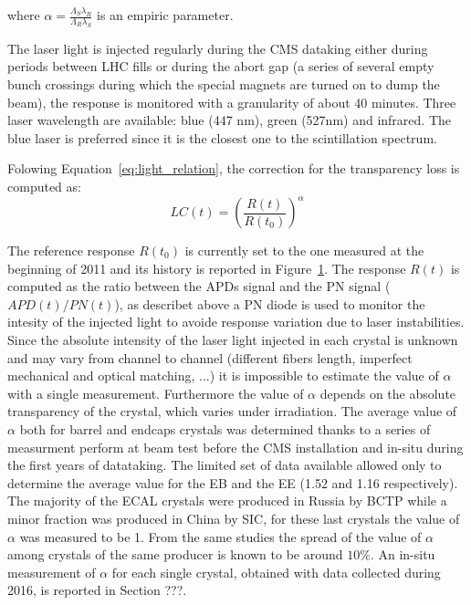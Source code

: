 where $\alpha = \frac{\Lambda_S \lambda_R}{\Lambda_R \lambda_S}$ is an empiric parameter.

The laser light is injected regularly during the CMS dataking either during periods between LHC fills or
during the abort gap (a series of several empty bunch crossings during which the special magnets 
are turned on to dump the beam), the response is monitored with a granularity of about 40 minutes.
Three laser wavelength are available: blue (447 nm), green (527nm) and infrared. The blue laser is
preferred since it is the closest one to the scintillation spectrum.

Folowing Equation~\ref{eq:light_relation}, the correction for the transparency loss is computed as:
\[
  LC(t) = \left(\frac{R(t)}{R(t_0)}\right)^{\alpha}
\]

The reference response $R(t_0)$  is currently set to the one measured at the beginning of 2011 and its history is
reported in Figure~\ref{fig:laser}.
The response $R(t)$ is computed as the ratio between the APDs signal and the PN signal ($APD(t)/PN(t)$), as describet above
a PN diode is used to monitor the intesity of the injected light to avoide response variation due to laser instabilities.
Since the absolute intensity of the laser light injected in each crystal is unknown and may vary from channel to channel
(different fibers length, imperfect mechanical and optical matching, ...) it is impossible to estimate the value of $\alpha$
with a single measurement. Furthermore the value of $\alpha$ depends on the absolute transparency of the crystal, which
varies under irradiation.
The average value of $\alpha$ both for barrel and endcaps crystals was determined thanks to a series of measurment perform
at beam test before the CMS installation and in-situ during the first years of datataking. The limited set of data available
allowed only to determine the average value for the EB and the EE (1.52 and 1.16 respectively).
The majority of the ECAL crystals were produced in
Russia by BCTP while a minor fraction was produced in China by SIC, for these last crystals the value of $\alpha$ was
measured to be 1. From the same studies the spread of the value of $\alpha$ among crystals of the same producer
is known to be around $10\%$. 
An in-situ measurement of $\alpha$ for each single crystal, obtained with data collected during 2016, is reported in Section ???.

\begin{figure}
  \centering
  \caption{}
  \label{fig:laser}
\end{figure}

